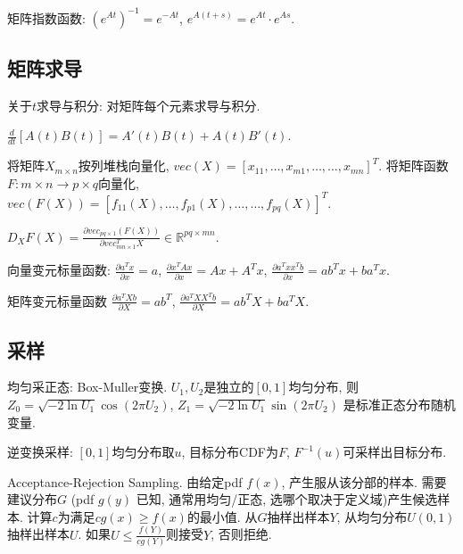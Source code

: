 \documentclass[UTF8]{ctexart}
\begin{document}
矩阵指数函数: $(e^{At})^{-1}=e^{-At}$, $e^{A(t+s)}=e^{At}\cdot e^{As}$.


\subsection{矩阵求导}
关于$t$求导与积分: 对矩阵每个元素求导与积分.

$\frac{d}{dt}[A(t)B(t)]=A'(t)B(t)+A(t)B'(t)$.

将矩阵$X_{m\times n}$按列堆栈向量化, $vec(X)=[x_{11},\dots,x_{m1},\dots,\dots,x_{mn}]^T$.
将矩阵函数$F:m\times n\to p\times q$向量化, $vec(F(X))=[f_{11}(X),\dots,f_{p1}(X),\dots,\dots,f_{pq}(X)]^T$.

$D_X F(X)=\frac{\partial vec_{pq\times 1}(F(X))}{\partial vec_{mn\times 1}^T X} \in \mathbb{R}^{pq\times mn}$.


向量变元标量函数:
$\frac{\partial a^Tx}{\partial x}=a$,
$\frac{\partial x^TAx}{\partial x}=Ax+A^Tx$,
$\frac{\partial a^T xx^T b}{\partial x}=ab^Tx+ba^Tx$.

矩阵变元标量函数
$\frac{\partial a^T X b}{\partial X}=ab^T$,
$\frac{\partial a^T XX^T b}{\partial X}=ab^TX+ba^TX$.

\subsection{采样}

均匀采正态: Box-Muller变换. $U_1, U_2$是独立的$[0, 1]$均匀分布,
则$Z_0=\sqrt{-2\ln U_1}\cos(2\pi U_2)$, $Z_1=\sqrt{-2\ln U_1}\sin(2\pi U_2)$
是标准正态分布随机变量.

逆变换采样: $[0,1]$均匀分布取$u$, 目标分布CDF为$F$, $F^{-1}(u)$可采样出目标分布.

Acceptance-Rejection Sampling.
由给定pdf $f(x)$, 产生服从该分部的样本.
需要建议分布$G$ (pdf $g(y)$ 已知, 通常用均匀/正态, 选哪个取决于定义域)产生候选样本.
计算$c$为满足$cg(x)\geq f(x)$的最小值.
从$G$抽样出样本$Y$, 从均匀分布$U(0,1)$抽样出样本$U$.
如果$U\leq\frac{f(Y)}{cg(Y)}$则接受$Y$, 否则拒绝.
\end{document}

